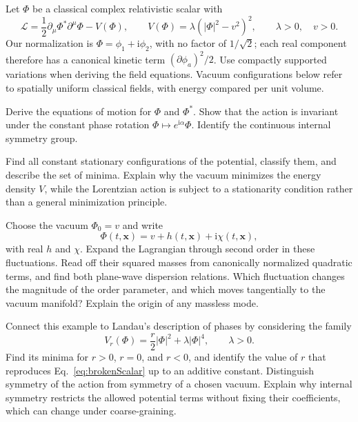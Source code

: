 \documentclass[11pt]{article}
\newcommand{\ii}{\mathrm{i}}
\newcommand{\Lag}{\mathcal L}
\begin{document}
Let \(\Phi\) be a classical complex relativistic scalar with
\begin{equation}
 \Lag=\frac12\partial_\mu\Phi^*\partial^\mu\Phi-V(\Phi),
 \qquad V(\Phi)=\lambda\left(|\Phi|^2-v^2\right)^2,
 \qquad \lambda>0,\quad v>0.
 \label{eq:brokenScalar}
\end{equation}
Our normalization is \(\Phi=\phi_1+\ii\phi_2\), with no factor of
\(1/\sqrt2\); each real component therefore has a canonical kinetic
term \((\partial\phi_a)^2/2\). Use compactly supported variations when
deriving the field equations. Vacuum configurations below refer to
spatially uniform classical fields, with energy compared per unit volume.

\begin{parts}
 \item Derive the equations of motion for \(\Phi\) and \(\Phi^*\).
 Show that the action is invariant under the constant phase rotation
 \(\Phi\mapsto e^{\ii\alpha}\Phi\). Identify the continuous internal
 symmetry group.

 \item Find all constant stationary configurations of the potential,
 classify them, and describe the set of minima. Explain why the vacuum
 minimizes the energy density \(V\), while the Lorentzian action is
 subject to a stationarity condition rather than a general minimization
 principle.

 \item Choose the vacuum \(\Phi_0=v\) and write
 \begin{equation}
 \Phi(t,\bm x)=v+h(t,\bm x)+\ii\chi(t,\bm x),
 \end{equation}
 with real \(h\) and \(\chi\). Expand the Lagrangian through second
 order in these fluctuations. Read off their squared masses from
 canonically normalized quadratic terms, and find both plane-wave
 dispersion relations. Which fluctuation changes the magnitude of the
 order parameter, and which moves tangentially to the vacuum manifold?
 Explain the origin of any massless mode.

 \item Connect this example to Landau's description of phases by
 considering the family
 \begin{equation}
 V_r(\Phi)=\frac r2|\Phi|^2+\lambda|\Phi|^4,
 \qquad \lambda>0.
 \label{eq:LandauFamily}
 \end{equation}
 Find its minima for \(r>0\), \(r=0\), and \(r<0\), and identify
 the value of \(r\) that reproduces Eq.~\eqref{eq:brokenScalar} up to
 an additive constant. Distinguish symmetry of the action from symmetry
 of a chosen vacuum. Explain why internal symmetry restricts the allowed
 potential terms without fixing their coefficients, which can change
 under coarse-graining.


\end{parts}
\end{document}
